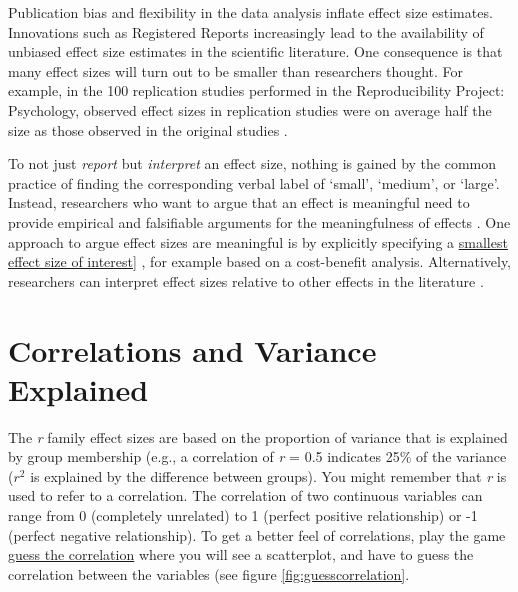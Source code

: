 \documentclass[
  oneside]{krantz}
\begin{document}
Publication bias and flexibility in the data analysis inflate effect size estimates. Innovations such as Registered Reports \citep{chambers_past_2022, nosek_registered_2014} increasingly lead to the availability of unbiased effect size estimates in the scientific literature. One consequence is that many effect sizes will turn out to be smaller than researchers thought. For example, in the 100 replication studies performed in the Reproducibility Project: Psychology, observed effect sizes in replication studies were on average half the size as those observed in the original studies \citep{open_science_collaboration_estimating_2015}.

To not just \emph{report} but \emph{interpret} an effect size, nothing is gained by the common practice of finding the corresponding verbal label of `small', `medium', or `large'. Instead, researchers who want to argue that an effect is meaningful need to provide empirical and falsifiable arguments for the meaningfulness of effects \citep{primbs_are_2022, anvari_not_2021}. One approach to argue effect sizes are meaningful is by explicitly specifying a \protect\hyperlink{sesoi}{smallest effect size of interest}{]} \citep{gotz_small_2022}, for example based on a cost-benefit analysis. Alternatively, researchers can interpret effect sizes relative to other effects in the literature \citep{baguley_standardized_2009, funder_evaluating_2019}.

\hypertarget{correlations-and-variance-explained}{%
\section{Correlations and Variance Explained}\label{correlations-and-variance-explained}}

The \emph{r} family effect sizes are based on the proportion of variance that is explained by group membership (e.g., a correlation of \emph{r} = 0.5 indicates 25\% of the variance (\(r^2\) is explained by the difference between groups). You might remember that \emph{r} is used to refer to a correlation. The correlation of two continuous variables can range from 0 (completely unrelated) to 1 (perfect positive relationship) or -1 (perfect negative relationship). To get a better feel of correlations, play the game \href{http://guessthecorrelation.com/}{guess the correlation} where you will see a scatterplot, and have to guess the correlation between the variables (see figure \ref{fig:guesscorrelation}.
\end{document}

